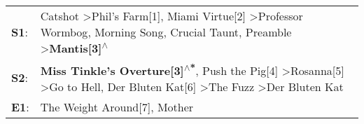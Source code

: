 \begin{supertabular}{p{0.03\textwidth}p{0.92\textwidth}}
 \textbf{S1}:  &  Catshot\textsuperscript{} \textgreater \enspace Phil's Farm[1]\textsuperscript{}, \enspace Miami Virtue[2]\textsuperscript{} \textgreater \enspace Professor Wormbog\textsuperscript{}, \enspace Morning Song\textsuperscript{}, \enspace Crucial Taunt\textsuperscript{}, \enspace Preamble\textsuperscript{} \textgreater \enspace \textbf{Mantis[3]\textsuperscript{$\wedge$}}  \enspace  \\
 \textbf{S2}:  &              \textbf{Miss Tinkle's Overture[3]\textsuperscript{$\wedge$*}}, \enspace Push the Pig[4]\textsuperscript{} \textgreater \enspace Rosanna[5]\textsuperscript{} \textgreater \enspace Go to Hell\textsuperscript{}, \enspace Der Bluten Kat[6]\textsuperscript{} \textgreater \enspace The Fuzz\textsuperscript{} \textgreater \enspace Der Bluten Kat\textsuperscript{}  \enspace  \\
 \textbf{E1}:  &                                                                                                                                                                                                                                                                                                          The Weight Around[7]\textsuperscript{}, \enspace Mother\textsuperscript{}  \enspace  \\
\end{supertabular}
